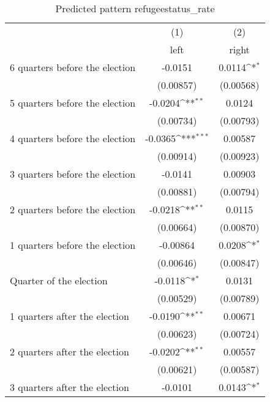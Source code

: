 \begin{table}[htbp]\centering
\def\sym#1{\ifmmode^{#1}\else\(^{#1}\)\fi}
\caption{Predicted pattern refugeestatus\_rate}
\begin{tabular}{l*{2}{c}}
\hline\hline
                    &\multicolumn{1}{c}{(1)}&\multicolumn{1}{c}{(2)}\\
                    &\multicolumn{1}{c}{left}&\multicolumn{1}{c}{right}\\
\hline
 6 quarters before the election&     -0.0151         &      0.0114\sym{*}  \\
                    &   (0.00857)         &   (0.00568)         \\
[1em]
 5 quarters before the election&     -0.0204\sym{**} &      0.0124         \\
                    &   (0.00734)         &   (0.00793)         \\
[1em]
 4 quarters before the election&     -0.0365\sym{***}&     0.00587         \\
                    &   (0.00914)         &   (0.00923)         \\
[1em]
 3 quarters before the election&     -0.0141         &     0.00903         \\
                    &   (0.00881)         &   (0.00794)         \\
[1em]
 2 quarters before the election&     -0.0218\sym{**} &      0.0115         \\
                    &   (0.00664)         &   (0.00870)         \\
[1em]
 1 quarters before the election&    -0.00864         &      0.0208\sym{*}  \\
                    &   (0.00646)         &   (0.00847)         \\
[1em]
Quarter of the election&     -0.0118\sym{*}  &      0.0131         \\
                    &   (0.00529)         &   (0.00789)         \\
[1em]
 1 quarters after the election&     -0.0190\sym{**} &     0.00671         \\
                    &   (0.00623)         &   (0.00724)         \\
[1em]
 2 quarters after the election&     -0.0202\sym{**} &     0.00557         \\
                    &   (0.00621)         &   (0.00587)         \\
[1em]
 3 quarters after the election&     -0.0101         &      0.0143\sym{*}  \\

\end{tabular}
\end{table}
